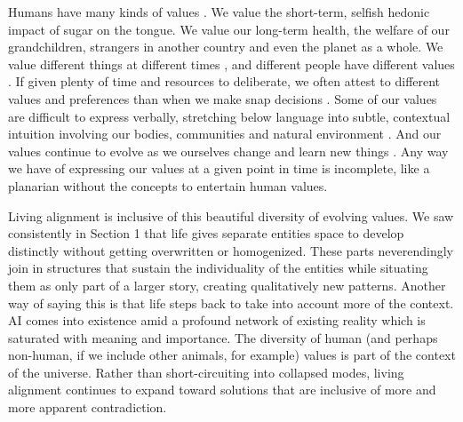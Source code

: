 \documentclass[12pt]{article}
\begin{document}
Humans have many kinds of values \citep{minsky1986society,tetlock1986value, nagel1979fragmentation, williams1981conflicts, stocker1992plural, haidt2001emotional}. We value the short-term, selfish hedonic impact of sugar on the tongue. We value our long-term health, the welfare of our grandchildren, strangers in another country and even the planet as a whole. We value different things at different times \citep{ainslie1992picoeconomics, loewenstein1996out, kohlberg1981philosophy, bardi2011dual}, and different people have different values \citep{rawls1993political,sorensen2024roadmap, berlin1969two}. If given plenty of time and resources to deliberate, we often attest to different values and preferences than when we make snap decisions \citep{yudkowsky2004coherent, rawls1971theory, firth1952ethical, brandt1979theory, smith1994moral, railton1986moral}. Some of our values are difficult to express verbally, stretching below language into subtle, contextual intuition involving our bodies, communities and natural environment \citep{nussbaum2001fragility, scott1998seeing, polanyi1966tacit, dreyfus1972computers, varela1991embodied, wittgenstein1922tractatus}. And our values continue to evolve as we ourselves change and learn new things \citep{singer1981expanding, murdoch2013sovereignty, williams1985ethics, dewey1939theory,gadamer1960wahrheit, nietzsche1883zarathustra}. Any way we have of expressing our values at a given point in time is incomplete, like a planarian without the concepts to entertain human values.

Living alignment is inclusive of this beautiful diversity of evolving values. We saw consistently in Section 1 that life gives separate entities space to develop distinctly without getting overwritten or homogenized. These parts neverendingly join in structures that sustain the individuality of the entities while situating them as only part of a larger story, creating qualitatively new patterns. Another way of saying this is that life steps back to take into account more of the context. AI comes into existence amid a profound network of existing reality which is saturated with meaning and importance. The diversity of human (and perhaps non-human, if we include other animals, for example) values is part of the context of the universe. Rather than short-circuiting into collapsed modes, living alignment continues to expand toward solutions that are inclusive of more and more apparent contradiction. 

\end{document}
